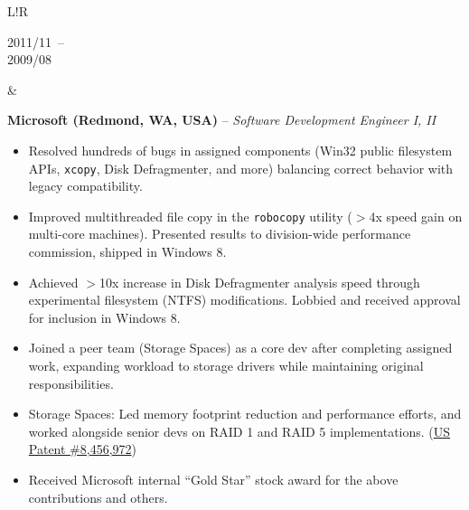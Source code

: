 \documentclass[10pt]{article}
\newcommand\VRule{\color{lightgray}\vrule width 0.5pt}
\def\spaceBetweenExperienceEntries{\vspace{8pt}&\vspace{8pt}\\}
\def\spaceBeforeExperienceBullets{\vspace{-10pt}}
\begin{document}
\begin{CJK}{UTF8}{gbsn}
\begin{tabular}{L!{\VRule}R}
    \parbox[t]{1.0\linewidth}{
        {\scriptsize 2011/11}~--\\
        {\scriptsize 2009/08}
    }&
    \parbox[t]{1.0\linewidth}{
        {\bf Microsoft (Redmond, WA, USA)} -- \textit{Software Development Engineer I, II}\\
        \spaceBeforeExperienceBullets
        \begin{itemize}[leftmargin=16pt]
            \item Resolved hundreds of bugs in assigned components (Win32 public filesystem APIs, \texttt{xcopy}, Disk Defragmenter, and more) balancing correct behavior with legacy compatibility.
            \item Improved multithreaded file copy in the \texttt{robocopy} utility ($>$4x speed gain on multi-core machines). Presented results to division-wide performance commission, shipped in Windows 8.
            \item Achieved $>$10x increase in Disk Defragmenter analysis speed through experimental filesystem (NTFS) modifications. Lobbied and received approval for inclusion in Windows 8.
            \item Joined a peer team (Storage Spaces) as a core dev after completing assigned work, expanding workload to storage drivers while maintaining original responsibilities.
            \item Storage Spaces: Led memory footprint reduction and performance efforts, and worked alongside senior devs on RAID 1 and RAID 5 implementations. (\href{http://www.google.com/patents/US8456972}{US Patent \#8,456,972})
            \item Received Microsoft internal ``Gold Star'' stock award for the above contributions and others.
        \end{itemize}
    }\\

\end{tabular}


\end{CJK}
\end{document}
